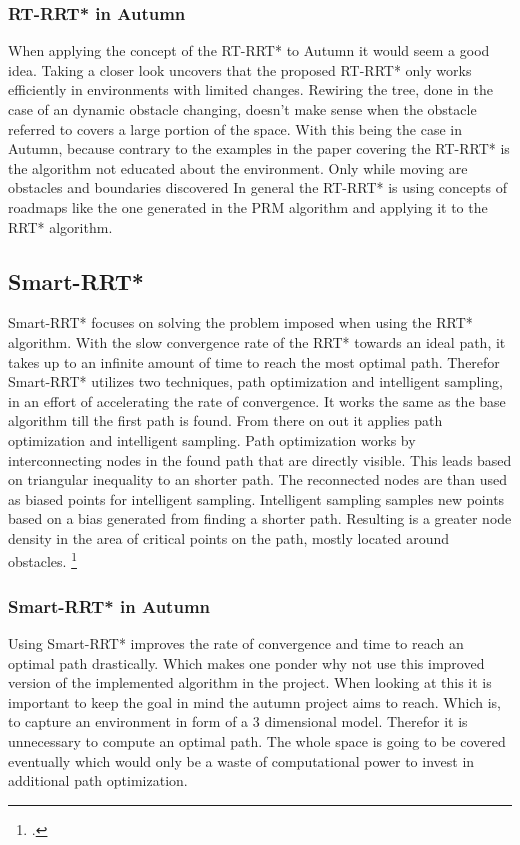 \subsubsection{RT-RRT* in Autumn}

When applying the concept of the RT-RRT* to Autumn it would seem a good idea. Taking a closer look uncovers that the proposed RT-RRT* only works efficiently in environments with limited changes. Rewiring the tree, done in the case of an dynamic obstacle changing, doesn't make sense when the obstacle referred to covers a large portion of the space. With this being the case in Autumn, because contrary to the examples in the paper covering the RT-RRT* is the algorithm not educated about the environment. Only while moving are obstacles and boundaries discovered In general the RT-RRT* is using concepts of roadmaps like the one generated in the PRM algorithm and applying it to the RRT* algorithm.  

\subsection{Smart-RRT*}

Smart-RRT* focuses on solving the problem imposed when using the RRT* algorithm. With the slow convergence rate of the RRT* towards an ideal path, it takes up to an infinite amount of time to reach the most optimal path. Therefor Smart-RRT* utilizes two techniques, path optimization and intelligent sampling, in an effort of accelerating the rate of convergence. 
It works the same as the base algorithm till the first path is found. From there on out it applies path optimization and intelligent sampling. Path optimization works by interconnecting nodes in the found path that are directly visible. This leads based on triangular inequality to an shorter path. The reconnected nodes are than used as biased points for intelligent sampling. Intelligent sampling samples new points based on a bias generated from finding a shorter path. Resulting is a greater node density in the area of critical points on the path, mostly located around obstacles. 
\footcite{Islam2012}

\subsubsection{Smart-RRT* in Autumn}
Using Smart-RRT* improves the rate of convergence and time to reach an optimal path drastically. Which makes one ponder why not use this improved version of the implemented algorithm in the project. When looking at this it is important to keep the goal in mind the autumn project aims to reach. Which is, to capture an environment in form of a 3 dimensional model. Therefor it is unnecessary to compute an optimal path. The whole space is going to be covered eventually which would only be a waste of computational power to invest in additional path optimization. 